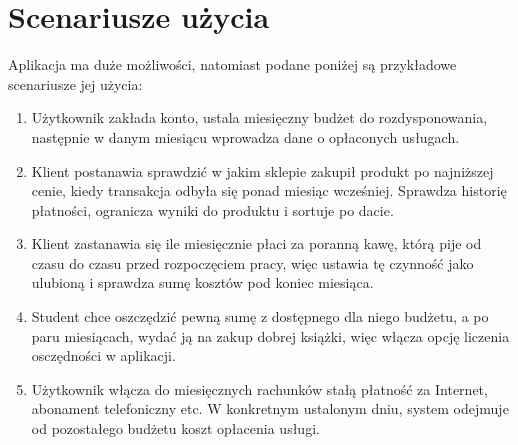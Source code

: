 \documentclass{article}
\begin{document}
    \section{Scenariusze użycia}
    Aplikacja ma duże możliwości, natomiast podane poniżej są 
przykładowe scenariusze jej użycia:
    \begin{enumerate}
    \item Użytkownik zakłada konto, ustala miesięczny budżet do 
rozdysponowania, następnie w danym miesiącu wprowadza dane o opłaconych 
usługach.
    \item Klient postanawia sprawdzić w jakim sklepie zakupił produkt po 
najniższej cenie, kiedy transakcja odbyła się ponad miesiąc wcześniej. 
Sprawdza historię płatności, ogranicza wyniki do produktu i sortuje po 
dacie.
    \item Klient zastanawia się ile miesięcznie płaci za poranną kawę, 
którą pije od czasu do czasu przed rozpoczęciem pracy, więc ustawia tę 
czynność jako ulubioną i sprawdza sumę kosztów pod koniec miesiąca.
    \item Student chce oszczędzić pewną sumę z dostępnego dla niego 
budżetu, a po paru miesiącach, wydać ją na zakup dobrej książki, więc 
włącza opcję liczenia osczędności w aplikacji.
    \item Użytkownik włącza do miesięcznych rachunków stałą płatność za 
Internet, abonament telefoniczny etc. W konkretnym ustalonym dniu, 
system odejmuje od pozostałego budżetu koszt opłacenia usługi.
    \end{enumerate}
    
    
    
\end{document}
